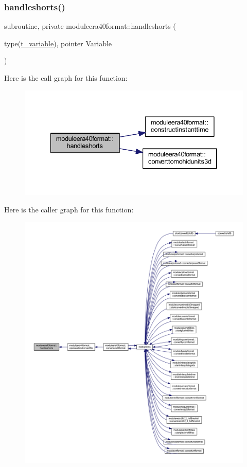 \subsubsection{\texorpdfstring{handleshorts()}{handleshorts()}}
{\footnotesize\ttfamily subroutine, private moduleera40format\+::handleshorts (\begin{DoxyParamCaption}\item[{type(\mbox{\hyperlink{structmoduleera40format_1_1t__variable}{t\+\_\+variable}}), pointer}]{Variable }\end{DoxyParamCaption})\hspace{0.3cm}{\ttfamily [private]}}

Here is the call graph for this function\+:\nopagebreak
\begin{figure}[H]
\begin{center}
\leavevmode
\includegraphics[width=334pt]{namespacemoduleera40format_a0a0c22e410451c81e0c573ad2174504f_cgraph}
\end{center}
\end{figure}
Here is the caller graph for this function\+:\nopagebreak
\begin{figure}[H]
\begin{center}
\leavevmode
\includegraphics[width=350pt]{namespacemoduleera40format_a0a0c22e410451c81e0c573ad2174504f_icgraph}
\end{center}
\end{figure}
